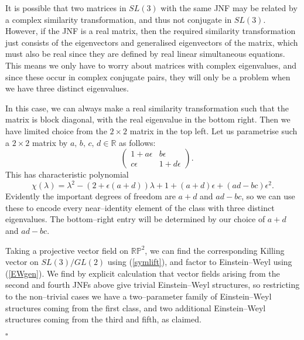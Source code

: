 It is possible that two matrices in $SL(3)$ with the same JNF may be related by a complex similarity transformation, and thus not conjugate in $SL(3)$. However, if the JNF is a real matrix, then the required similarity transformation just consists of the eigenvectors and generalised eigenvectors of the matrix, which must also be real since they are defined by real linear simultaneous equations. This means we only have to worry about matrices with complex eigenvalues, and since these occur in complex conjugate pairs, they will only be a problem when we have three distinct eigenvalues.

In this case, we can always make a real similarity transformation such that the matrix is block diagonal, with the real eigenvalue in the bottom right. Then we have limited choice from the $2\times 2$ matrix in the top left. Let us parametrise such a $2\times 2$ matrix by $a,\,b,\,c,\,d\in\mathbb{R}$ as follows:
\[
\quad
\begin{pmatrix}1+a\epsilon & b\epsilon \\
c\epsilon & 1+d\epsilon 
\end{pmatrix}.
\]
This has characteristic polynomial
\[
\chi(\lambda)=\lambda^2-(2+\epsilon(a+d))\lambda+1+(a+d)\epsilon+(ad-bc)\epsilon^2.
\]
Evidently the important degrees of freedom are $a+d$ and $ad-bc$, so we can use these to encode every near--identity element of the class with three distinct eigenvalues. The bottom--right entry will be determined by our choice of $a+d$ and $ad-bc$.

Taking a projective vector field on $\mathbb{RP}^2$, we can find the corresponding Killing vector on $SL(3)/GL(2)$ using (\ref{symlift}), and factor to Einstein--Weyl using (\ref{EWgen}). We find by explicit calculation that vector fields arising from the second and fourth JNFs above give trivial Einstein--Weyl structures, so restricting to the non--trivial cases we have a two--parameter family of Einstein--Weyl structures coming from the first class, and two additional Einstein--Weyl structures coming from the third and fifth, as claimed.
\begin{flushright}
$\square$
\par\end{flushright}
